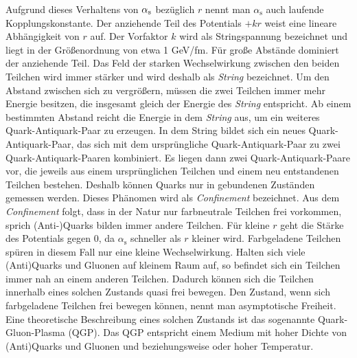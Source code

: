 Aufgrund dieses Verhaltens von $\alpha_{\rm{s}}$ bez\"uglich $r$ nennt man $\alpha_\text{s}$ auch laufende Kopplungskonstante.
\newline
Der anziehende Teil des Potentials $+kr$ weist eine lineare Abh\"angigkeit von $r$ auf.
Der Vorfaktor $k$ wird als Stringspannung bezeichnet und liegt in der Gr\"o{\ss}enordnung von etwa 1 GeV/fm.
F\"ur gro{\ss}e Abst\"ande dominiert der anziehende Teil.
Das Feld der starken Wechselwirkung zwischen den beiden Teilchen wird immer st\"arker und wird deshalb als \textit{String} bezeichnet.
Um den Abstand zwischen sich zu vergr\"o{\ss}ern, m\"ussen die zwei Teilchen immer mehr Energie besitzen, die insgesamt gleich der Energie des \textit{String} entspricht.
Ab einem bestimmten Abstand reicht die Energie in dem \textit{String} aus, um ein weiteres Quark-Antiquark-Paar zu erzeugen.
In dem String bildet sich ein neues Quark-Antiquark-Paar, das sich mit dem urspr\"ungliche Quark-Antiquark-Paar zu zwei Quark-Antiquark-Paaren kombiniert.
Es liegen dann zwei Quark-Antiquark-Paare vor, die jeweils aus einem urspr\"unglichen Teilchen und einem neu entstandenen Teilchen bestehen.
Deshalb k\"onnen Quarks nur in gebundenen Zust\"anden gemessen werden.
Dieses Ph\"anomen wird als \textit{Confinement} bezeichnet.
Aus dem \textit{Confinement} folgt, dass in der Natur nur farbneutrale Teilchen frei vorkommen, sprich (Anti-)Quarks bilden immer andere Teilchen.%
\newline
F\"ur kleine $r$ geht die St\"arke des Potentials gegen 0, da $\alpha_\text{s}$ schneller als $r$ kleiner wird.
Farbgeladene Teilchen sp\"uren in diesem Fall nur eine kleine Wechselwirkung.
Halten sich viele (Anti)Quarks und Gluonen auf kleinem Raum auf, so befindet sich ein Teilchen immer nah an einem anderen Teilchen.
Dadurch k\"onnen sich die Teilchen innerhalb eines solchen Zustands quasi frei bewegen.
Den Zustand, wenn sich farbgeladene Teilchen frei bewegen k\"onnen, nennt man asymptotische Freiheit.
\newline
Eine theoretische Beschreibung eines solchen Zustands ist das sogenannte Quark-Gluon-Plasma (QGP).
Das QGP entspricht einem Medium mit hoher Dichte von (Anti)Quarks und Gluonen und beziehungsweise oder hoher Temperatur.
